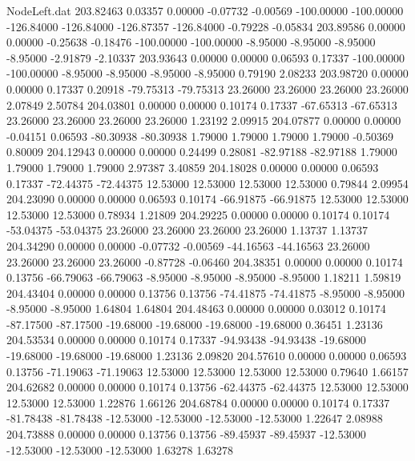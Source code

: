 \begin{filecontents}{NodeLeft.dat}
 203.82463    0.03357    0.00000    -0.07732   -0.00569 -100.00000 -100.00000 -126.84000 -126.84000 -126.87357 -126.84000   -0.79228   -0.05834
 203.89586    0.00000    0.00000    -0.25638   -0.18476 -100.00000 -100.00000   -8.95000   -8.95000   -8.95000   -8.95000   -2.91879   -2.10337
 203.93643    0.00000    0.00000     0.06593    0.17337 -100.00000 -100.00000   -8.95000   -8.95000   -8.95000   -8.95000    0.79190    2.08233
 203.98720    0.00000    0.00000     0.17337    0.20918  -79.75313  -79.75313   23.26000   23.26000   23.26000   23.26000    2.07849    2.50784
 204.03801    0.00000    0.00000     0.10174    0.17337  -67.65313  -67.65313   23.26000   23.26000   23.26000   23.26000    1.23192    2.09915
 204.07877    0.00000    0.00000    -0.04151    0.06593  -80.30938  -80.30938    1.79000    1.79000    1.79000    1.79000   -0.50369    0.80009
 204.12943    0.00000    0.00000     0.24499    0.28081  -82.97188  -82.97188    1.79000    1.79000    1.79000    1.79000    2.97387    3.40859
 204.18028    0.00000    0.00000     0.06593    0.17337  -72.44375  -72.44375   12.53000   12.53000   12.53000   12.53000    0.79844    2.09954
 204.23090    0.00000    0.00000     0.06593    0.10174  -66.91875  -66.91875   12.53000   12.53000   12.53000   12.53000    0.78934    1.21809
 204.29225    0.00000    0.00000     0.10174    0.10174  -53.04375  -53.04375   23.26000   23.26000   23.26000   23.26000    1.13737    1.13737
 204.34290    0.00000    0.00000    -0.07732   -0.00569  -44.16563  -44.16563   23.26000   23.26000   23.26000   23.26000   -0.87728   -0.06460
 204.38351    0.00000    0.00000     0.10174    0.13756  -66.79063  -66.79063   -8.95000   -8.95000   -8.95000   -8.95000    1.18211    1.59819
 204.43404    0.00000    0.00000     0.13756    0.13756  -74.41875  -74.41875   -8.95000   -8.95000   -8.95000   -8.95000    1.64804    1.64804
 204.48463    0.00000    0.00000     0.03012    0.10174  -87.17500  -87.17500  -19.68000  -19.68000  -19.68000  -19.68000    0.36451    1.23136
 204.53534    0.00000    0.00000     0.10174    0.17337  -94.93438  -94.93438  -19.68000  -19.68000  -19.68000  -19.68000    1.23136    2.09820
 204.57610    0.00000    0.00000     0.06593    0.13756  -71.19063  -71.19063   12.53000   12.53000   12.53000   12.53000    0.79640    1.66157
 204.62682    0.00000    0.00000     0.10174    0.13756  -62.44375  -62.44375   12.53000   12.53000   12.53000   12.53000    1.22876    1.66126
 204.68784    0.00000    0.00000     0.10174    0.17337  -81.78438  -81.78438  -12.53000  -12.53000  -12.53000  -12.53000    1.22647    2.08988
 204.73888    0.00000    0.00000     0.13756    0.13756  -89.45937  -89.45937  -12.53000  -12.53000  -12.53000  -12.53000    1.63278    1.63278

\end{filecontents}
